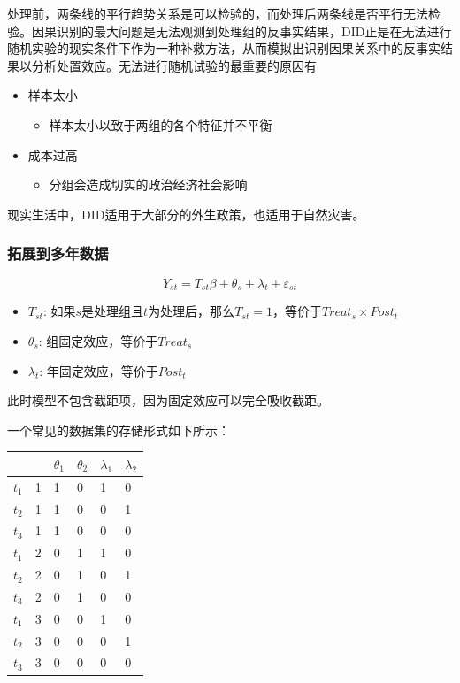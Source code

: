 \documentclass[11pt,a4paper]{ctexart}
\newcommand{\ve}{\varepsilon}
\begin{document}
处理前，两条线的平行趋势关系是可以检验的，而处理后两条线是否平行无法检验。因果识别的最大问题是无法观测到处理组的反事实结果，DID正是在无法进行随机实验的现实条件下作为一种补救方法，从而模拟出识别因果关系中的反事实结果以分析处置效应。无法进行随机试验的最重要的原因有

\begin{itemize}
\item
  样本太小

  \begin{itemize}
  \item
    样本太小以致于两组的各个特征并不平衡
  \end{itemize}
\item
  成本过高

  \begin{itemize}
  \item
    分组会造成切实的政治经济社会影响
  \end{itemize}
\end{itemize}

现实生活中，DID适用于大部分的外生政策，也适用于自然灾害。

\subsubsection{拓展到多年数据}

\[Y_{st}=T_{st}\beta+\theta_{s}+\lambda_t+\ve_{st}\]

\begin{itemize}
\item
  \(T_{st}\):
  如果\(s\)是处理组且\(t\)为处理后，那么\(T_{st}=1\)，等价于\(Treat_s\times Post_t\)
\item
  \(\theta_s\): 组固定效应，等价于\(Treat_s\)
\item
  \(\lambda_t\): 年固定效应，等价于\(Post_t\)
\end{itemize}

此时模型不包含截距项，因为固定效应可以完全吸收截距。

一个常见的数据集的存储形式如下所示：

\begin{longtable}[]{@{}llllll@{}}
\toprule\noalign{}
& & \(\theta_1\) & \(\theta_2\) & \(\lambda_1\) & \(\lambda_2\) \\
\midrule\noalign{}
\endhead
\bottomrule\noalign{}
\endlastfoot
\(t_1\) & 1 & 1 & 0 & 1 & 0 \\
\(t_2\) & 1 & 1 & 0 & 0 & 1 \\
\(t_3\) & 1 & 1 & 0 & 0 & 0 \\
\(t_1\) & 2 & 0 & 1 & 1 & 0 \\
\(t_2\) & 2 & 0 & 1 & 0 & 1 \\
\(t_3\) & 2 & 0 & 1 & 0 & 0 \\
\(t_1\) & 3 & 0 & 0 & 1 & 0 \\
\(t_2\) & 3 & 0 & 0 & 0 & 1 \\
\(t_3\) & 3 & 0 & 0 & 0 & 0 \\
\end{longtable}
\end{document}
